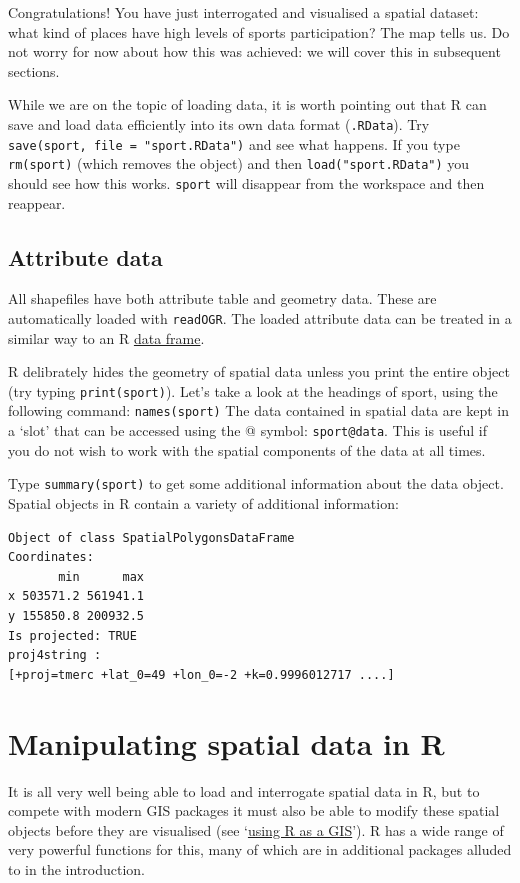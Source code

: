 \documentclass[]{article}
\begin{document}
Congratulations! You have just interrogated and visualised a spatial
dataset: what kind of places have high levels of sports participation?
The map tells us. Do not worry for now about how this was achieved: we
will cover this in subsequent sections.

While we are on the topic of loading data, it is worth pointing out that
R can save and load data efficiently into its own data format
(\texttt{.RData}). Try \texttt{save(sport, file = "sport.RData")} and
see what happens. If you type \texttt{rm(sport)} (which removes the
object) and then \texttt{load("sport.RData")} you should see how this
works. \texttt{sport} will disappear from the workspace and then
reappear.

\subsection{Attribute data}

All shapefiles have both attribute table and geometry data. These are
automatically loaded with \texttt{readOGR}. The loaded attribute data
can be treated in a similar way to an R
\href{http://www.statmethods.net/input/datatypes.html}{data frame}.

R delibrately hides the geometry of spatial data unless you print the
entire object (try typing \texttt{print(sport)}). Let's take a look at
the headings of sport, using the following command:
\texttt{names(sport)} The data contained in spatial data are kept in a
`slot' that can be accessed using the @ symbol: \texttt{sport@data}.
This is useful if you do not wish to work with the spatial components of
the data at all times.

Type \texttt{summary(sport)} to get some additional information about
the data object. Spatial objects in R contain a variety of additional
information:

\begin{verbatim}
Object of class SpatialPolygonsDataFrame
Coordinates:
       min      max
x 503571.2 561941.1
y 155850.8 200932.5
Is projected: TRUE 
proj4string :
[+proj=tmerc +lat_0=49 +lon_0=-2 +k=0.9996012717 ....]
\end{verbatim}
\section{Manipulating spatial data in R}

It is all very well being able to load and interrogate spatial data in
R, but to compete with modern GIS packages it must also be able to
modify these spatial objects before they are visualised (see
`\href{https://github.com/Pakillo/R-GIS-tutorial}{using R as a GIS}'). R
has a wide range of very powerful functions for this, many of which are
in additional packages alluded to in the introduction.
\end{document}
